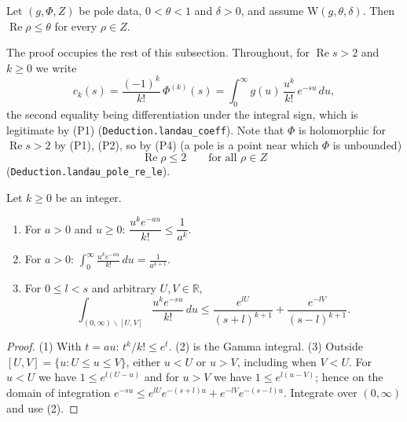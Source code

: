 \begin{theorem}\label{pn:P022}

\par{}\par
Let $(g,\Phi,Z)$ be pole data, $0<\theta<1$ and $\delta>0$, and assume
$\mathrm{W}(g,\theta,\delta)$. Then $\operatorname{Re}\rho\le\theta$ for every $\rho\in Z$.
\end{theorem}

The proof occupies the rest of this subsection. Throughout, for $\operatorname{Re}s>2$ and
$k\ge0$ we write
\[
c_k(s)=\frac{(-1)^{k}}{k!}\,\Phi^{(k)}(s)=\int_0^\infty g(u)\,\frac{u^{k}}{k!}\,e^{-su}\,du ,
\]
the second equality being differentiation under the integral sign, which is legitimate by (P1)
(\texttt{Deduction.landau\_coeff}). Note that $\Phi$ is holomorphic for $\operatorname{Re}s>2$ by
(P1), (P2), so by (P4) (a pole is a point near which $\Phi$ is unbounded)
\begin{equation}\label{eq:E-poles-left}
\operatorname{Re}\rho\le2\qquad\text{for all }\rho\in Z
\end{equation}
(\texttt{Deduction.landau\_pole\_re\_le}).

\begin{lemma}\label{lem:E-kernel}

\par{}\par
Let $k\ge0$ be an integer.
\begin{enumerate}
\item For $a>0$ and $u\ge0$: $\dfrac{u^{k}e^{-au}}{k!}\le\dfrac1{a^{k}}$.
\item For $a>0$: $\displaystyle\int_0^\infty\frac{u^{k}e^{-au}}{k!}\,du=\frac1{a^{k+1}}$.
\item For $0\le l<s$ and arbitrary $U,V\in\mathbb R$,
\[
\int_{(0,\infty)\smallsetminus[U,V]}\frac{u^{k}e^{-su}}{k!}\,du\le
\frac{e^{lU}}{(s+l)^{k+1}}+\frac{e^{-lV}}{(s-l)^{k+1}} .
\]
\end{enumerate}
\end{lemma}
\begin{proof}
(1) With $t=au$: $t^{k}/k!\le e^{t}$. (2) is the Gamma integral. (3) Outside $[U,V]=\{u:U\le u\le V\}$, either $u<U$ or $u>V$, including when $V<U$. For $u<U$ we have
$1\le e^{l(U-u)}$ and for $u>V$ we have $1\le e^{l(u-V)}$; hence on the domain of integration
$e^{-su}\le e^{lU}e^{-(s+l)u}+e^{-lV}e^{-(s-l)u}$. Integrate over $(0,\infty)$ and use (2).

\end{proof}

